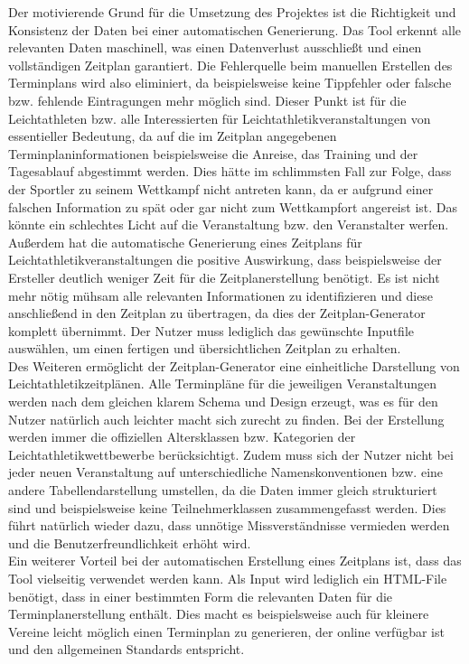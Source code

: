 Der motivierende Grund für die Umsetzung des Projektes ist die Richtigkeit und Konsistenz der Daten bei einer automatischen Generierung. Das Tool erkennt alle relevanten Daten maschinell, was einen Datenverlust ausschließt und einen vollständigen Zeitplan garantiert. Die Fehlerquelle beim manuellen Erstellen des Terminplans wird also eliminiert, da beispielsweise keine Tippfehler oder falsche bzw. fehlende Eintragungen mehr möglich sind. Dieser Punkt ist für die Leichtathleten bzw. alle Interessierten für Leichtathletikveranstaltungen von essentieller Bedeutung, da auf die im Zeitplan angegebenen Terminplaninformationen beispielsweise die Anreise, das Training und der Tagesablauf abgestimmt werden. Dies hätte im schlimmsten Fall zur Folge, dass der Sportler zu seinem Wettkampf nicht antreten kann, da er aufgrund einer falschen Information zu spät oder gar nicht zum Wettkampfort angereist ist. Das könnte ein schlechtes Licht auf die Veranstaltung bzw. den Veranstalter werfen.\\
Außerdem hat die automatische Generierung eines Zeitplans für Leichtathletikveranstaltungen die positive Auswirkung, dass beispielsweise der Ersteller deutlich weniger Zeit für die Zeitplanerstellung benötigt. Es ist nicht mehr nötig mühsam alle relevanten Informationen zu identifizieren und diese anschließend in den Zeitplan zu übertragen, da dies der Zeitplan-Generator komplett übernimmt. Der Nutzer muss lediglich das gewünschte Inputfile auswählen, um einen fertigen und übersichtlichen Zeitplan zu erhalten. \\
Des Weiteren ermöglicht der Zeitplan-Generator eine einheitliche Darstellung von Leichtathletikzeitplänen. Alle Terminpläne für die jeweiligen Veranstaltungen werden nach dem gleichen klarem Schema und Design erzeugt, was es für den Nutzer natürlich auch leichter macht sich zurecht zu finden. Bei der Erstellung werden immer die offiziellen Altersklassen bzw. Kategorien der Leichtathletikwettbewerbe berücksichtigt. Zudem muss sich der Nutzer nicht bei jeder neuen Veranstaltung auf unterschiedliche Namenskonventionen bzw. eine andere Tabellendarstellung umstellen, da die Daten immer gleich strukturiert sind und beispielsweise keine Teilnehmerklassen zusammengefasst werden. Dies führt natürlich wieder dazu, dass unnötige Missverständnisse vermieden werden und die Benutzerfreundlichkeit erhöht wird.\\
Ein weiterer Vorteil bei der automatischen Erstellung eines Zeitplans ist, dass das Tool vielseitig verwendet werden kann. Als Input wird lediglich ein HTML-File benötigt, dass in einer bestimmten Form die relevanten Daten für die Terminplanerstellung enthält. Dies macht es beispielsweise auch für kleinere Vereine leicht möglich einen Terminplan zu generieren, der online verfügbar ist und den allgemeinen Standards entspricht.\\
